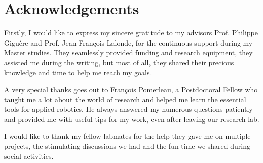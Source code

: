 \chapter*{Acknowledgements}

Firstly, I would like to express my sincere gratitude to my advisors Prof. Philippe Giguère and Prof. Jean-François Lalonde, for the continuous support during my Master studies. They seamlessly provided funding and research equipment, they assisted me during the writing, but most of all, they shared their precious knowledge and time to help me reach my goals. 

A very special thanks goes out to François Pomerleau, a Postdoctoral Fellow who taught me a lot about the world of research and helped me learn the essential tools for applied robotics. He always answered my numerous questions patiently and provided me with useful tips for my work, even after leaving our research lab.

I would like to thank my fellow labmates for the help they gave me on multiple projects, the stimulating discussions we had and the fun time we shared during social activities.  
